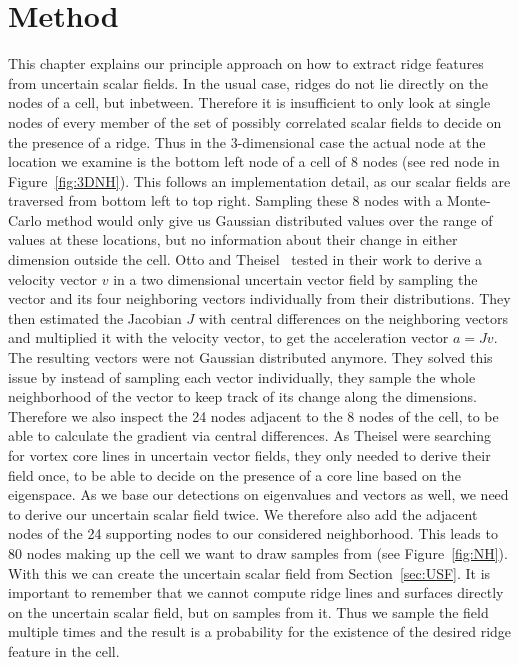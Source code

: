 \chapter{Method}\label{chap:Method}

This chapter explains our principle approach on how to extract ridge
features from uncertain scalar fields. In the usual case, ridges do not
lie directly on the nodes of a cell, but inbetween. Therefore it is
insufficient to only look at single nodes of every member of the set of
possibly correlated scalar fields to decide on the presence of a ridge.
Thus in the $3$-dimensional case the actual node at the location we
examine is the bottom left node of a cell of 8 nodes (see red node in
Figure~\ref{fig:3DNH}). This follows an implementation detail, as our
scalar fields are traversed from bottom left to top right. Sampling
these 8 nodes with a Monte-Carlo method would only give us Gaussian
distributed values over the range of values at these locations, but no
information about their change in either dimension outside the cell.
Otto and Theisel~\cite{Vortex} tested in their work to derive a velocity
vector $v$ in a two dimensional uncertain vector field by sampling the
vector and its four neighboring vectors individually from their
distributions. They then estimated the Jacobian $J$ with central
differences on the neighboring vectors and multiplied it with the
velocity vector, to get the acceleration vector $a = J v$. The resulting
vectors were not Gaussian distributed anymore. They solved this issue by
instead of sampling each vector individually, they sample the whole
neighborhood of the vector to keep track of its change along the
dimensions. Therefore we also inspect the 24 nodes adjacent to the 8
nodes of the cell, to be able to calculate the gradient via central
differences. As Theisel \etal{} were searching for vortex core lines in
uncertain vector fields, they only needed to derive their field once, to
be able to decide on the presence of a core line based on the
eigenspace. As we base our detections on eigenvalues and vectors as
well, we need to derive our uncertain scalar field twice. We therefore
also add the adjacent nodes of the 24 supporting nodes to our considered
neighborhood. This leads to 80 nodes making up the cell we want to draw
samples from (see Figure~\ref{fig:NH}). With this we can create the
uncertain scalar field from Section~\ref{sec:USF}. It is important to
remember that we cannot compute ridge lines and surfaces directly on the
uncertain scalar field, but on samples from it. Thus we sample the field
multiple times and the result is a probability for the existence of the
desired ridge feature in the cell.

